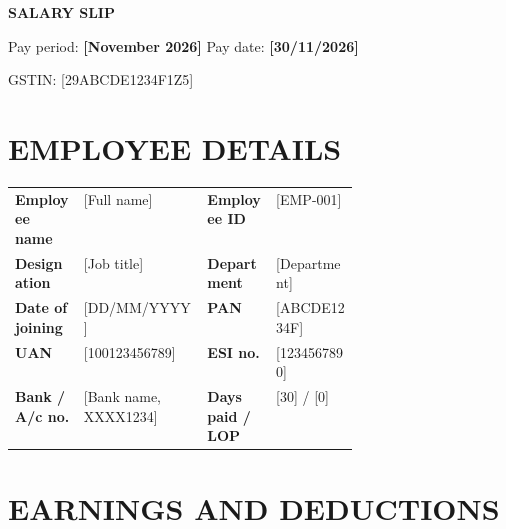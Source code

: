 \documentclass[10pt]{article}
\begin{document}
\fontsize{10.5}{13.2}\selectfont
{\color{accent}\fontsize{30}{34}\selectfont\bfseries SALARY SLIP}\par\vspace{3pt}

{\fontsize{13.5}{16}\selectfont Pay period: \textbf{[November 2026]}   \textbar{}   Pay date: \textbf{[30/11/2026]}}\par\vspace{4pt}

{\fontsize{8.8}{11} \enspace\textbar{} \enspace\textbar\enspace GSTIN: [29ABCDE1234F1Z5]}\par

\vspace{5pt}{\color{accent}\rule{\linewidth}{1.8pt}}\par

\section{EMPLOYEE DETAILS}

\begin{tabularx}{\linewidth}{@{}p{0.2\linewidth}X p{0.2\linewidth}X@{}}
\textbf{Employee name} & [Full name] & \textbf{Employee ID} & [EMP-001] \\
\textbf{Designation} & [Job title] & \textbf{Department} & [Department] \\
\textbf{Date of joining} & [DD/MM/YYYY] & \textbf{PAN} & [ABCDE1234F] \\
\textbf{UAN} & [100123456789] & \textbf{ESI no.} & [1234567890] \\
\textbf{Bank / A/c no.} & [Bank name, XXXX1234] & \textbf{Days paid / LOP} & [30] / [0] \\
\end{tabularx}\par\vspace{2pt}

\section{EARNINGS AND DEDUCTIONS}
\end{document}
